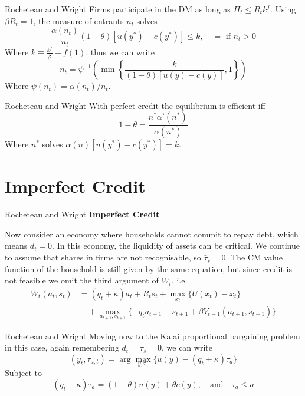 \documentclass[aspectratio=169,xcolor=dvipsnames]{beamer}
\begin{document}
\begin{frame}{Rocheteau and Wright}
    Firms participate in the DM as long as $\Pi_t \le R_t k^f$. Using $\beta R_t = 1$, the measure of entrants $n_t$ solves
    \[
        \frac{\alpha(n_t)}{n_t}(1 - \theta)[u(y^*) - c(y^*)] \le k, \quad = \text{ if } n_t > 0
    \]
    Where $k \equiv \frac{k^f}{\beta} - f(1)$, thus we can write
    \[
        n_t = \psi^{-1}\left( \min \left\{ \frac{k}{(1-\theta)[u(y) - c(y)]}, 1 \right\} \right)
    \]
    Where $\psi(n_t) = \alpha(n_t)/n_t$.
\end{frame}

\begin{frame}{Rocheteau and Wright}
    With perfect credit the equilibrium is efficient iff
    \[
        1 - \theta = \frac{n^* \alpha'(n^*)}{\alpha(n^*)}
    \]
    Where $n^*$ solves $\alpha(n)[u(y^*) - c(y^*)] = k$.
\end{frame}

\section{Imperfect Credit}

\begin{frame}{Rocheteau and Wright}
    \textbf{Imperfect Credit}

    Now consider an economy where households cannot commit to repay debt, which means $d_t = 0$. In this economy, the liquidity of assets can be critical. We continue to assume that shares in firms are not recognisable, so $\bar \tau_s = 0$. The CM value function of the household is still given by the same equation, but since credit is not feasible we omit the third argument of $W_t$, i.e.
    \begin{align*}
        W_t(a_t, s_t) &= (q_t + \kappa) a_t + R_t s_t + \max_{x_t}\{U(x_t) - x_t\} \\
        &\quad + \max_{a_{t+1}, s_{t+1}}\{-q_t a_{t+1} - s_{t+1} + \beta V_{t+1}(a_{t+1}, s_{t+1})\}
    \end{align*}
\end{frame}

\begin{frame}{Rocheteau and Wright}
    Moving now to the Kalai proportional bargaining problem in this case, again remembering $d_t = \bar \tau_s = 0$, we can write
    \[
        (y_t, \tau_{a,t}) = \arg \max_{y, \tau_a} \{u(y) - (q_t + \kappa) \tau_a\}
    \]
    Subject to
    \[
        (q_t + \kappa) \tau_a = (1 - \theta) u(y) + \theta c(y), \quad \text{and} \quad \tau_a \le a
    \]
\end{frame}
\end{document}
